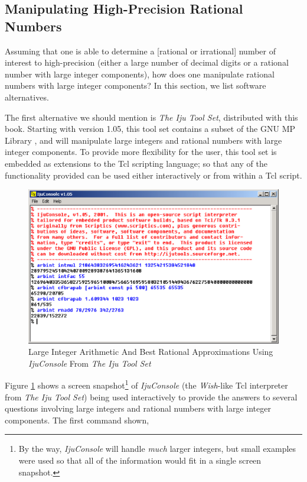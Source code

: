 \subsection{Manipulating High-Precision Rational Numbers}
\label{ccfr0:sptq0:smhp0}

Assuming that one is able to determine a [rational or irrational] number
of interest to high-precision (either a large number of decimal digits or a rational
number with large integer components), how does
one manipulate rational numbers with large integer components?
In this section, we list software alternatives.

The first alternative we should mention is \emph{The Iju Tool Set}, distributed
with this book.  Starting with version 1.05, this tool set contains
a subset of the GNU MP Library \cite{bibref:s:gnumultipleprecisionarithmeticlibrary}, 
and will manipulate 
large integers and rational numbers with large integer components.  To provide
more flexibility for the user, this tool set is embedded as extensions to
the Tcl scripting language; so that any of the functionality provided can be
used either interactively or from within a Tcl script.

\begin{figure}
\centering
\includegraphics[width=4.6in]{c_cfr0/ijt_ss01.eps}
\caption{Large Integer Arithmetic And Best Rational Approximations Using \emph{IjuConsole}
         From \emph{The Iju Tool Set}}
\label{fig:ccfr0:sptq0:smhp0:00}
\end{figure}

Figure \ref{fig:ccfr0:sptq0:smhp0:00} shows a screen snapshot\footnote{By
the way, \emph{IjuConsole} will handle \emph{much} larger integers, but 
small examples were used so that all of the information would fit
in a single screen snapshot.} of
\emph{IjuConsole} (the \emph{Wish}-like Tcl
interpreter from \emph{The Iju Tool Set}) being used interactively
to provide the answers to several questions involving large integers and
rational numbers with large integer components.  The first command
shown,\\

